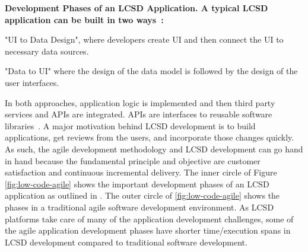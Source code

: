 \nd\bf{Development Phases of an  LCSD Application.} A typical  LCSD application can be built in two ways~\cite{sahay2020supporting}: \begin{inparaenum}
\item "UI to Data Design", where developers create UI and then connect the UI to necessary data sources. \item "Data to UI" where the design of the data model is followed by the design of the user interfaces. \end{inparaenum} In both approaches, application logic is implemented and then third party services and APIs are integrated. APIs are interfaces to reusable software libraries~\cite{Robillard-APIProperty-IEEETSE2012}.  
A major motivation behind  LCSD development is to build applications, get reviews from the users, and incorporate those changes quickly. As such, the agile development methodology \cite{beck2001manifesto} and  LCSD development can go hand in hand because the fundamental principle and objective are customer satisfaction and continuous incremental delivery. The inner circle of Figure \ref{fig:low-code-agile} shows the important development phases of an  LCSD application as outlined in  \cite{sahay2020supporting}. The outer circle of \fig\ref{fig:low-code-agile} shows the phases in a traditional agile software development environment. As  LCSD platforms take care of many of the application development challenges, some of the agile application development phases have shorter time/execution spans in  LCSD development compared to traditional software development. 








 

